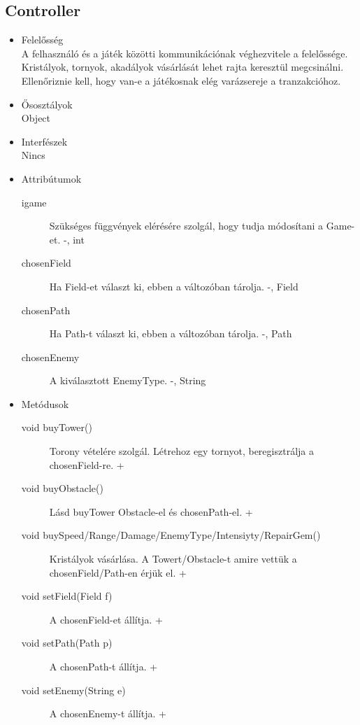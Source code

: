 \subsection{Controller}
\begin{itemize}
\item Felelősség\\
A felhasználó és a játék közötti kommunikációnak véghezvitele a felelőssége. Kristályok, tornyok, akadályok vásárlását lehet rajta keresztül megcsinálni. Ellenőriznie kell, hogy van-e a játékosnak elég varázsereje a tranzakcióhoz.
\item Ősosztályok\\
Object
\item Interfészek\\
Nincs
\item Attribútumok\\
	\begin{description}
		\item[igame] Szükséges függvények elérésére szolgál, hogy tudja módosítani a Game-et. -, int
		\item[chosenField] Ha Field-et választ ki, ebben a változóban tárolja. -, Field
		\item[chosenPath] Ha Path-t választ ki, ebben a változóban tárolja. -, Path
		\item[chosenEnemy] A kiválasztott EnemyType. -, String

		
	\end{description}
\item Metódusok\\
	\begin{description}
		
		\item[void buyTower()] Torony vételére szolgál. Létrehoz egy tornyot, beregisztrálja a chosenField-re. +
		\item[void buyObstacle()] Lásd buyTower Obstacle-el és chosenPath-el. +
		\item[void buySpeed/Range/Damage/EnemyType/Intensiyty/RepairGem()] Kristályok vásárlása. A Towert/Obstacle-t amire vettük a chosenField/Path-en érjük el. +
		\item[void setField(Field f)] A chosenField-et állítja. +
		\item[void setPath(Path p)] A chosenPath-t állítja. +
		\item[void setEnemy(String e)] A chosenEnemy-t állítja. +
		
		
		
	\end{description}
\end{itemize}

